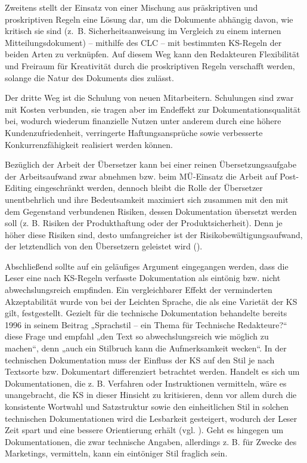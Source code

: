 Zweitens stellt der Einsatz von einer Mischung aus präskriptiven und proskriptiven Regeln eine Lösung dar, um die Dokumente abhängig davon, wie kritisch sie sind (z.~B. Sicherheitsanweisung im Vergleich zu einem internen Mitteilungsdokument) -- mithilfe des CLC -- mit bestimmten KS-Regeln der beiden Arten zu verknüpfen. Auf diesem Weg kann den Redakteuren Flexibilität und Freiraum für Kreativität durch die proskriptiven Regeln verschafft werden, solange die Natur des Dokuments dies zulässt.

Der dritte Weg ist die Schulung von neuen Mitarbeitern. Schulungen sind zwar mit Kosten verbunden, sie tragen aber im Endeffekt zur Dokumentationsqualität bei, wodurch wiederum finanzielle Nutzen unter anderem durch eine höhere Kundenzufriedenheit, verringerte Haftungsansprüche sowie verbesserte Konkurrenzfähigkeit realisiert werden können.

Bezüglich der Arbeit der Übersetzer kann bei einer reinen Übersetzungsaufgabe der Arbeitsaufwand zwar abnehmen bzw. beim MÜ-Einsatz die Arbeit auf Post-Editing eingeschränkt werden, dennoch bleibt die Rolle der Übersetzer unentbehrlich und ihre Bedeutsamkeit maximiert sich zusammen mit den mit dem Gegenstand verbundenen Risiken, dessen Dokumentation übersetzt werden soll (z. B. Risiken der Produkthaftung oder der Produktsicherheit). Denn je höher diese Risiken sind, desto umfangreicher ist der Risikobewältigungsaufwand, der letztendlich von den Übersetzern geleistet wird (\citealt{CanforaOttmann2015}).

Abschließend sollte auf ein geläufiges Argument eingegangen werden, dass die Leser eine nach KS-Regeln verfasste Dokumentation als eintönig bzw. nicht abwechslungsreich empfinden. Ein vergleichbarer Effekt der verminderten Akzeptabilität wurde von \citet{Hansen-SchirraMaaß2020}  bei der Leichten Sprache, die als eine Varietät der KS gilt, festgestellt. Gezielt für die technische Dokumentation behandelte \citet[335f.]{Püschel1996} bereits 1996 in seinem Beitrag „Sprachstil -- ein Thema für Technische Redakteure?“ diese Frage und empfahl „den Text so abwechslungsreich wie möglich zu machen“, denn „auch ein Stilbruch kann die Aufmerksamkeit wecken“. In der technischen Dokumentation muss der Einfluss der KS auf den Stil je nach Textsorte bzw. Dokumentart differenziert betrachtet werden. Handelt es sich um Dokumentationen, die z. B. Verfahren oder Instruktionen vermitteln, wäre es unangebracht, die KS in dieser Hinsicht zu kritisieren, denn vor allem durch die konsistente Wortwahl und Satzstruktur sowie den einheitlichen Stil in solchen technischen Dokumentationen wird die Lesbarkeit gesteigert, wodurch der Leser Zeit spart und eine bessere Orientierung erhält (vgl. \citealt{Farkas1985}). Geht es hingegen um Dokumentationen, die zwar technische Angaben, allerdings z. B. für Zwecke des Marketings, vermitteln, kann ein eintöniger Stil fraglich sein.


